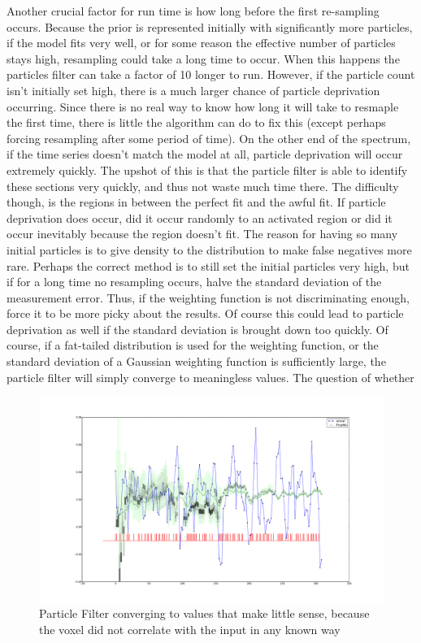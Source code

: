Another crucial factor for run time is how long before the first re-sampling 
occurs. Because the prior is represented initially with significantly more
particles, if the model fits very well, or for some reason the effective
number of particles stays high, resampling could take a long time to occur.
When this happens the particles filter can take a factor of 10 longer to run.
However, if the particle count isn't initially set high, there is a much larger
chance of particle deprivation occurring. Since there is no real way to know
how long it will take to resmaple the first time, there is little the 
algorithm can do to fix this (except perhaps forcing resampling after
some period of time). On the other end of the spectrum, if the time
series doesn't match the model at all, particle deprivation will occur extremely
quickly.  The upshot of this is that the particle filter is able to 
identify these sections very quickly, and thus not waste much time there.
The difficulty though, is the regions in between the perfect fit and the
awful fit. If particle deprivation does occur, did it occur randomly to an
activated region or did it occur inevitably because the region doesn't fit.
The reason for having so many initial particles is to give density to the
distribution to make false negatives more rare. Perhaps the correct method
is to still set the initial particles very high, but if for a long time no
resampling occurs, halve the standard deviation of the measurement error.
Thus, if the weighting function is not discriminating enough, force it 
to be more picky about the results. Of course this could lead to particle
deprivation as well if the standard deviation is brought down too quickly.
Of course, if a fat-tailed distribution is used for the weighting function,
or the standard deviation of a Gaussian weighting function is sufficiently large,
the particle filter will simply converge to meaningless values. The question
of whether 

\begin{figure}
\label{fig:badfit}
\includegraphics[trim=10cm 4cm 10cm 4cm, width=16cm]{images/inactive_illogical}
\caption{Particle Filter converging to values that make little sense,
because the voxel did not correlate with the input in any known way}
\end{figure}

